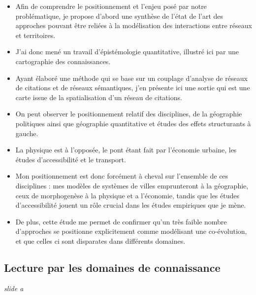 \documentclass[12pt]{article}
\begin{document}
\begin{itemize}
	\item Afin de comprendre le positionnement et l'enjeu posé par notre problématique, je propose d'abord une synthèse de l'état de l'art des approches pouvant être reliées à la modélisation des interactions entre réseaux et territoires.%
	\item J'ai donc mené un travail d'épistémologie quantitative, illustré ici par une cartographie des connaissances.
	\item Ayant élaboré une méthode qui se base sur un couplage d'analyse de réseaux de citations et de réseaux sémantiques, j'en présente ici une sortie qui est une carte issue de la spatialisation d'un réseau de citations.
	\item On peut observer le positionnement relatif des disciplines, de la géographie politiques ainsi que géographie quantitative et études des effets structurants à gauche.
	\item La physique est à l'opposée, le pont étant fait par l'économie urbaine, les études d'accessibilité et le transport.
	\item Mon positionnement est donc forcément à cheval sur l'ensemble de ces disciplines : mes modèles de systèmes de villes emprunteront à la géographie, ceux de morphogenèse à la physique et a l'économie, tandis que les études d'accessibilité jouent un rôle crucial dans les études empiriques que je mène.
	\item De plus, cette étude me permet de confirmer qu'un très faible nombre d'approches se positionne explicitement comme modélisant une co-évolution, et que celles ci sont disparates dans différents domaines.
\end{itemize}



\newpage


\subsection*{Lecture par les domaines de connaissance}

\textit{slide a}
\end{document}
